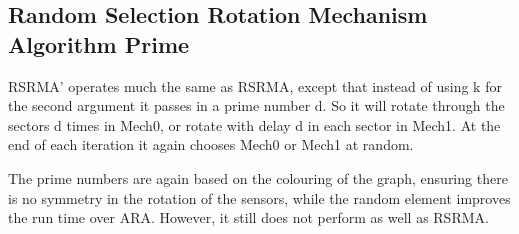 \subsection{Random Selection Rotation Mechanism Algorithm Prime}
RSRMA' operates much the same as RSRMA, except that instead of using k for the second argument it passes in a prime number d. So it will rotate through the sectors d times in Mech0, or rotate with delay d in each sector in Mech1. At the end of each iteration it again chooses Mech0 or Mech1 at random.

The prime numbers are again based on the colouring of the graph, ensuring there is no symmetry in the rotation of the sensors, while the random element improves the run time over ARA. However, it still does not perform as well as RSRMA.

